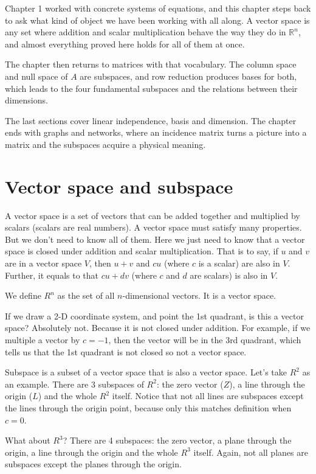 \documentclass[10pt,a4paper,oneside,numbers=noenddot]{scrbook}
\theoremstyle{ctplain}
\theoremstyle{ctresult}
\begin{document}
Chapter 1 worked with concrete systems of equations, and this chapter steps back to ask
what kind of object we have been working with all along. A vector space is any set where
addition and scalar multiplication behave the way they do in $\mathbb{R}^n$, and almost
everything proved here holds for all of them at once.

The chapter then returns to matrices with that vocabulary. The column space and null space
of $A$ are subspaces, and row reduction produces bases for both, which leads to the four
fundamental subspaces and the relations between their dimensions.

The last sections cover linear independence, basis and dimension. The chapter ends with
graphs and networks, where an incidence matrix turns a picture into a matrix and the
subspaces acquire a physical meaning.


\section{Vector space and subspace}

A vector space is a set of vectors that can be added together and multiplied by scalars
(scalars are real numbers). A vector space must satisfy many properties. But we don't
need to know all of them. Here we just need to know that a vector space is closed under
addition and scalar multiplication. That is to say, if $u$ and $v$ are in a vector space
$V$, then $u + v$ and $cu$ (where $c$ is a scalar) are also in $V$. Further, it equals
to that $cu + dv$ (where $c$ and $d$ are scalars) is also in $V$.

We define $R^{n}$ as the set of all $n$-dimensional vectors. It is a vector space.

If we draw a 2-D coordinate system, and point the 1st quadrant, is this a vector space?
Absolutely not. Because it is not closed under addition. For example, if we multiple a
vector by $c = -1$, then the vector will be in the 3rd quadrant, which tells us that
the 1st quadrant is not closed so not a vector space.

Subspace is a subset of a vector space that is also a vector space. Let's take $R^{2}$
as an example. There are 3 subspaces of $R^{2}$: the zero vector ($Z$), a line through
the origin ($L$) and the whole $R^{2}$ itself. Notice that not all lines are subspaces
except the lines through the origin point, because only this matches definition when
$c = 0$.

What about $R^{3}$? There are 4 subspaces: the zero vector, a plane through the origin,
a line through the origin and the whole $R^{3}$ itself. Again, not all planes are
subspaces except the planes through the origin.
\end{document}
